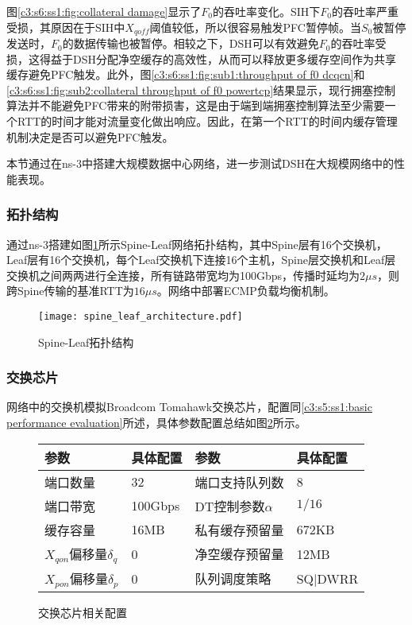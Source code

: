图\ref{c3:s6:ss1:fig:collateral damage}显示了$F_0$的吞吐率变化。SIH下$F_0$的吞吐率严重受损，其原因在于SIH中$X_{\mathit{qoff}}$阈值较低，所以很容易触发PFC暂停帧。当$S_0$被暂停发送时，$F_0$的数据传输也被暂停。相较之下，DSH可以有效避免$F_0$的吞吐率受损，这得益于DSH分配净空缓存的高效性，从而可以释放更多缓存空间作为共享缓存避免PFC触发。此外，图\ref{c3:s6:ss1:fig:sub1:throughput of f0 dcqcn}和\ref{c3:s6:ss1:fig:sub2:collateral throughput of f0 powertcp}结果显示，现行拥塞控制算法并不能避免PFC带来的附带损害，这是由于端到端拥塞控制算法至少需要一个RTT的时间才能对流量变化做出响应。因此，在第一个RTT的时间内缓存管理机制决定是否可以避免PFC触发。


本节通过在ns-3中搭建大规模数据中心网络，进一步测试DSH在大规模网络中的性能表现。

\subsubsection{拓扑结构}

通过ns-3搭建如图\ref{fig:c3:spine leaf topology}所示Spine-Leaf网络拓扑结构，其中Spine层有16个交换机，Leaf层有16个交换机，每个Leaf交换机下连接16个主机，Spine层交换机和Leaf层交换机之间两两进行全连接，所有链路带宽均为100Gbps，传播时延均为$2 \mu s$，则跨Spine传输的基准RTT为$16 \mu s$。网络中部署ECMP负载均衡机制。

\begin{figure}[H]
  \centering
  \texttt{[image: spine\_leaf\_architecture.pdf]}
  \caption{Spine-Leaf拓扑结构}
  \label{fig:c3:spine leaf topology}
\end{figure}

\subsubsection{交换芯片}

网络中的交换机模拟Broadcom Tomahawk交换芯片，配置同\ref{c3:s5:ss1:basic performance evaluation}所述，具体参数配置总结如图\ref{fig:c3:parameter setting in switch chip}所示。

\begin{figure}[H]
  \begin{table}[H]
      \begin{tabularx}{\textwidth}{YYYY}
      \toprule
          \textbf{参数} & \textbf{具体配置} & \textbf{参数} & \textbf{具体配置} \\
      \midrule
          端口数量 & 32 & 端口支持队列数 & 8 \\
          端口带宽 & 100Gbps & DT控制参数$\alpha$ & $1/16$ \\
          缓存容量 & 16MB & 私有缓存预留量 & 672KB \\
          $X_{qon}$偏移量$\delta_q$ & 0 & 净空缓存预留量 & 12MB \\
          $X_{pon}$偏移量$\delta_p$ & 0 & 队列调度策略 & SQ|DWRR \\
      \bottomrule
      \end{tabularx}
  \end{table}
  \caption{交换芯片相关配置}
  \label{fig:c3:parameter setting in switch chip}
\end{figure}



